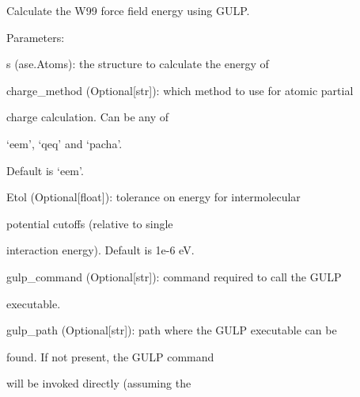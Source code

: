\documentclass[letterpaper,10pt,english]{sphinxmanual}
\begin{document}
\begin{fulllineitems}
\label{doctree/soprano.calculate.gulp.w99:soprano.calculate.gulp.w99.get_w99_energy}
Calculate the W99 force field energy using GULP.

\begin{DUlineblock}{0em}
\item[] Parameters:
\item[]
\begin{DUlineblock}{\DUlineblockindent}
\item[] s (ase.Atoms): the structure to calculate the energy of
\item[] charge\_method (Optional{[}str{]}): which method to use for atomic partial
\item[]
\begin{DUlineblock}{\DUlineblockindent}
\item[] charge calculation. Can be any of
\item[] `eem', `qeq' and `pacha'.
\item[] Default is `eem'.
\end{DUlineblock}
\item[] Etol (Optional{[}float{]}): tolerance on energy for intermolecular
\item[]
\begin{DUlineblock}{\DUlineblockindent}
\item[] potential cutoffs (relative to single
\item[] interaction energy). Default is 1e-6 eV.
\end{DUlineblock}
\item[] gulp\_command (Optional{[}str{]}): command required to call the GULP
\item[]
\begin{DUlineblock}{\DUlineblockindent}
\item[] executable.
\end{DUlineblock}
\item[] gulp\_path (Optional{[}str{]}): path where the GULP executable can be
\item[]
\begin{DUlineblock}{\DUlineblockindent}
\item[] found. If not present, the GULP command
\item[] will be invoked directly (assuming the

\end{DUlineblock}
\end{DUlineblock}
\end{DUlineblock}
\end{fulllineitems}
\end{document}
